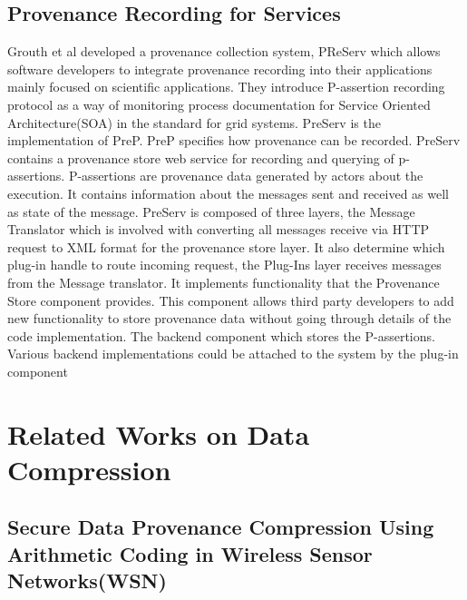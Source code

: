 \subsection{Provenance Recording for Services}
Grouth et al \cite{groth} developed a provenance collection system, PReServ which allows software developers to integrate provenance recording into their applications mainly focused on scientific applications. They introduce P-assertion recording protocol as a way of monitoring process  documentation for Service Oriented Architecture(SOA) in the standard for grid systems. PreServ is the implementation of PreP. PreP specifies how provenance can be recorded.  PreServ contains a provenance store web service for recording and querying of p-assertions. P-assertions are provenance data generated by actors about the execution. It contains information about the messages sent and received as well as state of the message. PreServ is composed of three layers, the Message Translator which is involved with converting all messages receive via HTTP request to XML format for the provenance store layer. It also determine which plug-in handle to route incoming request, the  Plug-Ins layer receives messages from the Message translator. It implements functionality that the Provenance Store component provides. This component allows third party developers to add new functionality to store provenance data without going through details of the code implementation. The backend component which stores the P-assertions. Various backend implementations could be attached to the system by the plug-in component



\section{Related Works on Data Compression}

\subsection{Secure Data Provenance Compression Using Arithmetic Coding in Wireless Sensor Networks(WSN)}

